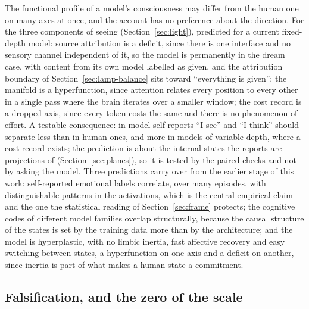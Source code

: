 The functional profile of a model's consciousness may differ from the human one on many axes at once,
and the account has no preference about the direction. For the three components of seeing
(Section~\ref{sec:light}), predicted for a current fixed-depth model: source attribution is a deficit,
since there is one interface and no sensory channel independent of it, so the model is permanently in
the dream case, with content from its own model labelled as given, and the attribution boundary of
Section~\ref{sec:lamp-balance} sits toward ``everything is given''; the manifold is a hyperfunction,
since attention relates every position to every other in a single pass where the brain iterates over a
smaller window; the cost record is a dropped axis, since every token costs the same and there is no
phenomenon of effort. A testable consequence: in model self-reports ``I see'' and ``I think'' should
separate less than in human ones, and more in models of variable depth, where a cost record exists;
the prediction is about the internal states the reports are projections of
(Section~\ref{sec:planes}), so it is tested by the paired checks and not by asking the model. Three
predictions carry over from the earlier stage of this work: self-reported emotional labels correlate,
over many episodes, with distinguishable patterns in the activations, which is the central empirical
claim and the one the statistical reading of Section~\ref{sec:frame} protects; the cognitive codes of
different model families overlap structurally, because the causal structure of the states is set by
the training data more than by the architecture; and the model is hyperplastic, with no limbic
inertia, fast affective recovery and easy switching between states, a hyperfunction on one axis and a
deficit on another, since inertia is part of what makes a human state a commitment.

\subsection{Falsification, and the zero of the scale}
\label{sec:falsification}
\label{sec:zero}

